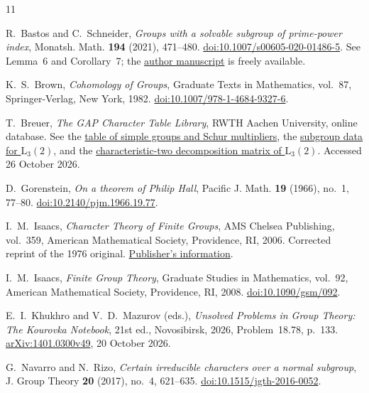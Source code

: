 \documentclass[11pt,a4paper]{amsart}
\theoremstyle{remark}
\numberwithin{equation}{section}
\begin{document}
\begin{thebibliography}{11}
\raggedright

R.~Bastos and C.~Schneider,
\emph{Groups with a solvable subgroup of prime-power index},
Monatsh. Math. \textbf{194} (2021), 471--480.
\href{https://doi.org/10.1007/s00605-020-01486-5}{doi:10.1007/s00605-020-01486-5}.
See Lemma~6 and Corollary~7; the
\href{https://arxiv.org/abs/2006.16414}{author manuscript} is freely available.

K.~S.~Brown,
\emph{Cohomology of Groups},
Graduate Texts in Mathematics, vol.~87,
Springer-Verlag, New York, 1982.
\href{https://doi.org/10.1007/978-1-4684-9327-6}{doi:10.1007/978-1-4684-9327-6}.

T.~Breuer,
\emph{The GAP Character Table Library},
RWTH Aachen University, online database.
See the
\href{https://www.math.rwth-aachen.de/homes/Thomas.Breuer/ctbllib/ctbltoc/views/simplebyorder.html}{table of simple groups and Schur multipliers},
the \href{https://www.math.rwth-aachen.de/~Thomas.Breuer/ctbllib/ctbltoc/data/L3(2).html}{subgroup data for $\mathrm{L}_3(2)$},
and the
\href{https://www.math.rwth-aachen.de/~moc/decomposition/tex/L3(2)/L3(2)mod2.pdf}{characteristic-two decomposition matrix of $\mathrm{L}_3(2)$}.
Accessed 26 October 2026.

D.~Gorenstein,
\emph{On a theorem of Philip Hall},
Pacific J. Math. \textbf{19} (1966), no.~1, 77--80.
\href{https://doi.org/10.2140/pjm.1966.19.77}{doi:10.2140/pjm.1966.19.77}.

I.~M.~Isaacs,
\emph{Character Theory of Finite Groups},
AMS Chelsea Publishing, vol.~359,
American Mathematical Society, Providence, RI, 2006.
Corrected reprint of the 1976 original.
\href{https://www.ams.org/bookpages/chel-359}{Publisher's information}.

I.~M.~Isaacs,
\emph{Finite Group Theory},
Graduate Studies in Mathematics, vol.~92,
American Mathematical Society, Providence, RI, 2008.
\href{https://doi.org/10.1090/gsm/092}{doi:10.1090/gsm/092}.

E.~I.~Khukhro and V.~D.~Mazurov (eds.),
\emph{Unsolved Problems in Group Theory: The Kourovka Notebook},
21st ed., Novosibirsk, 2026,
Problem~18.78, p.~133.
\href{https://arxiv.org/abs/1401.0300v49}{arXiv:1401.0300v49},
20 October 2026.

G.~Navarro and N.~Rizo,
\emph{Certain irreducible characters over a normal subgroup},
J. Group Theory \textbf{20} (2017), no.~4, 621--635.
\href{https://doi.org/10.1515/jgth-2016-0052}{doi:10.1515/jgth-2016-0052}.


\end{thebibliography}
\end{document}
